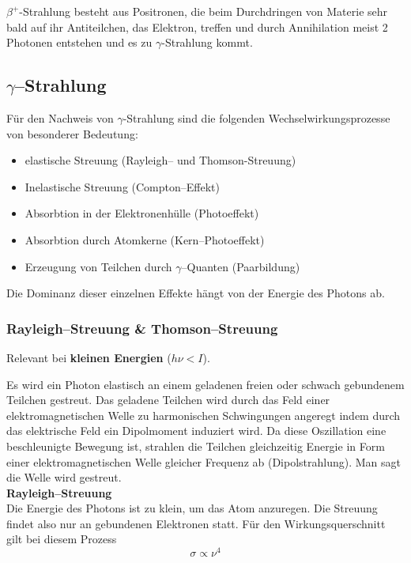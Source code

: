 \documentclass[Ex4_Zusammenfassung.tex]{subfiles}
\begin{document}
$\beta^+$-Strahlung besteht aus Positronen, die beim Durchdringen von Materie sehr bald auf ihr Antiteilchen, das Elektron, treffen und durch Annihilation meist 2 Photonen entstehen und es zu $\gamma$-Strahlung kommt.

\subsection{$\gamma$--Strahlung}
Für den Nachweis von $\gamma$-Strahlung sind die folgenden Wechselwirkungsprozesse von besonderer Bedeutung:
\begin{itemize}
	\item elastische Streuung (Rayleigh-- und Thomson-Streuung)
	\item Inelastische Streuung (Compton--Effekt)
	\item Absorbtion in der Elektronenhülle (Photoeffekt)
	\item Absorbtion durch Atomkerne (Kern--Photoeffekt)
	\item Erzeugung von Teilchen durch $\gamma$--Quanten (Paarbildung)
\end{itemize}
Die Dominanz dieser einzelnen Effekte hängt von der Energie des Photons ab.

\subsubsection{Rayleigh--Streuung \& Thomson--Streuung}
Relevant bei \textbf{kleinen Energien} ($h \nu < I $). 

Es wird ein Photon elastisch an einem geladenen freien oder schwach gebundenem Teilchen gestreut. Das geladene Teilchen wird durch das Feld einer elektromagnetischen Welle zu harmonischen Schwingungen angeregt indem durch das elektrische Feld ein Dipolmoment induziert wird. Da diese Oszillation eine beschleunigte Bewegung ist, strahlen die Teilchen gleichzeitig Energie in Form einer elektromagnetischen Welle gleicher Frequenz ab (Dipolstrahlung). Man sagt die Welle wird gestreut. \\ 

\textbf{Rayleigh--Streuung} \\ 

 Die Energie des Photons ist zu klein, um das Atom anzuregen. Die Streuung findet also nur an gebundenen Elektronen statt. Für den Wirkungsquerschnitt gilt bei diesem Prozess
\begin{equation}
\sigma \propto \nu^4
\end{equation}
\end{document}

